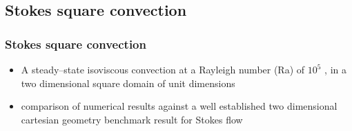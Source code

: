 \subsection{Stokes square convection}

\begin{frame}
    \frametitle{Stokes square convection}
\begin{itemize}
\item A steady–state isoviscous convection at a Rayleigh number (Ra) of $10^5$ , in a
  two dimensional square domain of unit dimensions 
\item comparison of numerical results against a well established two dimensional cartesian geometry
  benchmark result for Stokes flow
\end{itemize}
\end{frame}

